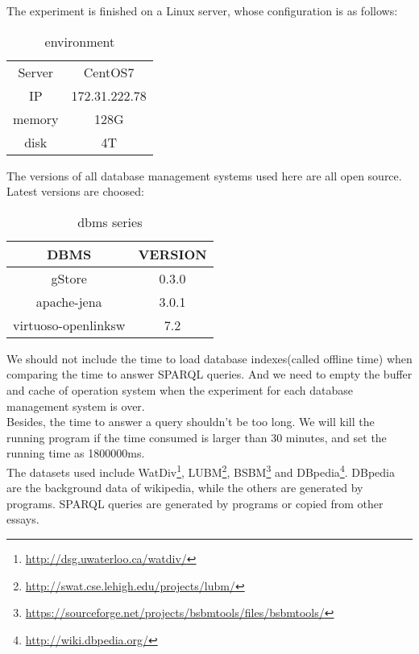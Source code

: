 \documentclass[titlepage, a4paper, 12pt] {article}
\begin{document}
The experiment is finished on a Linux server, whose configuration is as follows: \\
\begin{table}[!hbp]
	\centering
	\begin{tabular}{|c|c|}
		\toprule
		Server & CentOS7 \\
		IP & 172.31.222.78 \\ 
		\midrule
		memory & 128G \\
		disk & 4T \\
		\bottomrule
	\end{tabular}
	\caption{environment}
\end{table}

The versions of all database management systems used here are all open source. Latest versions are choosed: \\
\begin{table}[!hbp]
	\centering
	\begin{tabular}{|c|c|}
		\toprule
		DBMS & VERSION \\
		\midrule
		gStore & 0.3.0 \\
		apache-jena & 3.0.1 \\
		virtuoso-openlinksw & 7.2 \\
		\bottomrule
	\end{tabular}
	\caption{dbms series}
\end{table}

We should not include the time to load database indexes(called offline time) when comparing the time to answer SPARQL queries. And we need to empty the buffer and cache of operation system when the experiment for each database management system is over. \\

Besides, the time to answer a query shouldn't be too long. We will kill the running program if the time consumed is larger than 30 minutes, and set the running time as 1800000ms. \\

The datasets used include WatDiv\footnote{\href{http://dsg.uwaterloo.ca/watdiv/}{http://dsg.uwaterloo.ca/watdiv/}}, 
LUBM\footnote{\href{http://swat.cse.lehigh.edu/projects/lubm/}{http://swat.cse.lehigh.edu/projects/lubm/}}, BSBM\footnote{\href{https://sourceforge.net/projects/bsbmtools/files/bsbmtools/}{https://sourceforge.net/projects/bsbmtools/files/bsbmtools/}} and DBpedia\footnote{\href{http://wiki.dbpedia.org/}{http://wiki.dbpedia.org/}}. DBpedia are the background data of wikipedia, 
while the others are generated by programs. SPARQL queries are generated by programs or copied from other essays. \\
\end{document}
